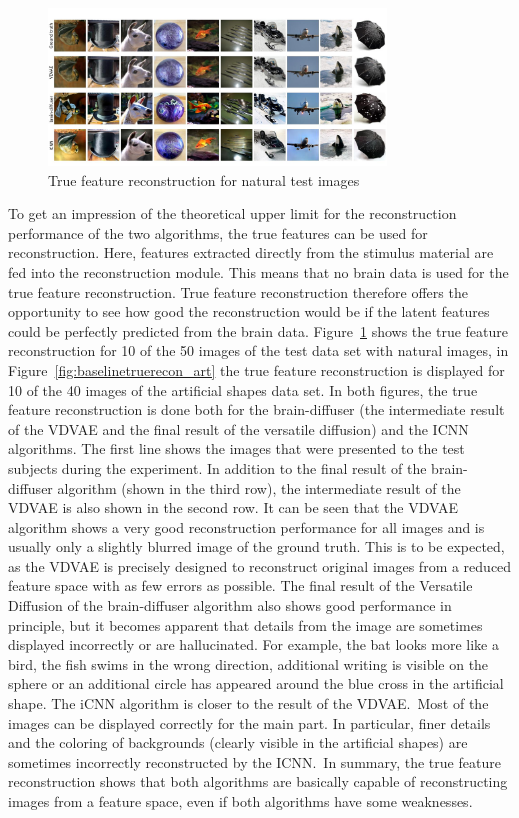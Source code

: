 \begin{figure}[ht]
    \centering
    \includegraphics[width=0.8\textwidth]{plots/baseline_qual_true_recon_test.JPEG}
    \caption{True feature reconstruction for natural test images}\label{fig:baselinetruerecon}
\end{figure}
To get an impression of the theoretical upper limit for the reconstruction performance of the two algorithms, the true features can be used for reconstruction. Here, features extracted directly from the stimulus material are fed into the reconstruction module. This means that no brain data is used for the true feature reconstruction. True feature reconstruction therefore offers the opportunity to see how good the reconstruction would be if the latent features could be perfectly predicted from the brain data. Figure~\ref{fig:baselinetruerecon} shows the true feature reconstruction for 10 of the 50 images of the test data set with natural images, in Figure~\ref{fig:baselinetruerecon_art} the true feature reconstruction is displayed for 10 of the 40 images of the artificial shapes data set. In both figures, the true feature reconstruction is done both for the brain-diffuser (the intermediate result of the VDVAE and the final result of the versatile diffusion) and the ICNN algorithms. The first line shows the images that were presented to the test subjects during the experiment. In addition to the final result of the brain-diffuser algorithm (shown in the third row), the intermediate result of the VDVAE is also shown in the second row. It can be seen that the VDVAE algorithm shows a very good reconstruction performance for all images and is usually only a slightly blurred image of the ground truth. This is to be expected, as the VDVAE is precisely designed to reconstruct original images from a reduced feature space with as few errors as possible. The final result of the Versatile Diffusion of the brain-diffuser algorithm also shows good performance in principle, but it becomes apparent that details from the image are sometimes displayed incorrectly or are hallucinated. For example, the bat looks more like a bird, the fish swims in the wrong direction, additional writing is visible on the sphere or an additional circle has appeared around the blue cross in the artificial shape. The iCNN algorithm is closer to the result of the VDVAE.\ Most of the images can be displayed correctly for the main part. In particular, finer details and the coloring of backgrounds (clearly visible in the artificial shapes) are sometimes incorrectly reconstructed by the ICNN.\ In summary, the true feature reconstruction shows that both algorithms are basically capable of reconstructing images from a feature space, even if both algorithms have some weaknesses.


